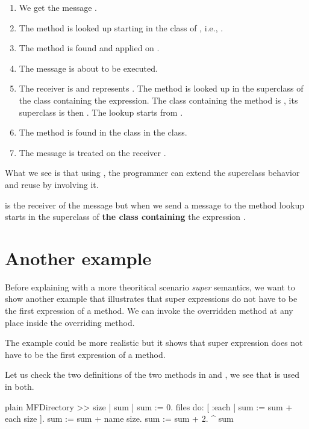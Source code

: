 \documentclass[10pt,twoside,english]{_support/latex/sbabook/sbabook}
\begin{document}
\begin{enumerate}
\item We get the message .
\item The method  is looked up starting in the class of , i.e., .
\item The method is found and applied on .
\item The message   is about to be executed.
\item The receiver is  and represents . The method  is looked up in the superclass of the class containing the expression. The class containing the method is , its superclass is then . The lookup starts from .
\item The method is found in the class  in the class.
\item The message  is treated on the receiver .
\end{enumerate}

What we see is that using , the programmer can extend the superclass behavior and reuse by involving it.

\begin{important}
 is the receiver of the message but when we send a message to  the method lookup starts in the superclass of \textbf{the class containing} the expression .
\end{important}
\section{Another example}
Before explaining with a more theoritical scenario \textit{super} semantics, we want to show another example that illustrates that super expressions do not have to be the first expression of a method. We can invoke the overridden method at any place inside the overriding method.

The example could be more realistic but it shows that super expression does not have to be the first expression of a method.

Let us check the two definitions of the two methods  in  and , we see that  is used in both.

\begin{displaycode}{plain}
MFDirectory >> size
	| sum |
	sum := 0.
	files do: [ :each | sum := sum + each size ].
	sum := sum + name size.
	sum := sum + 2.
	^ sum
\end{displaycode}
\end{document}
